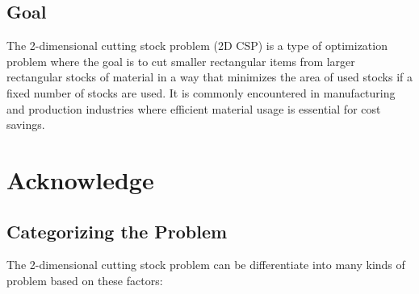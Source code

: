 \documentclass[a4paper]{article}
\begin{document}
\subsection{Goal}
The 2-dimensional cutting stock problem (2D CSP)  is a type of optimization problem where the goal is to cut smaller rectangular items from larger rectangular stocks of material in a way that minimizes the area of used stocks if a fixed number of stocks are used. It is commonly encountered in manufacturing and production industries where efficient material usage is essential for cost savings.

\section{Acknowledge}
\subsection{Categorizing the Problem}
The 2-dimensional cutting stock problem can be differentiate into many kinds of problem based on these factors:
\end{document}

